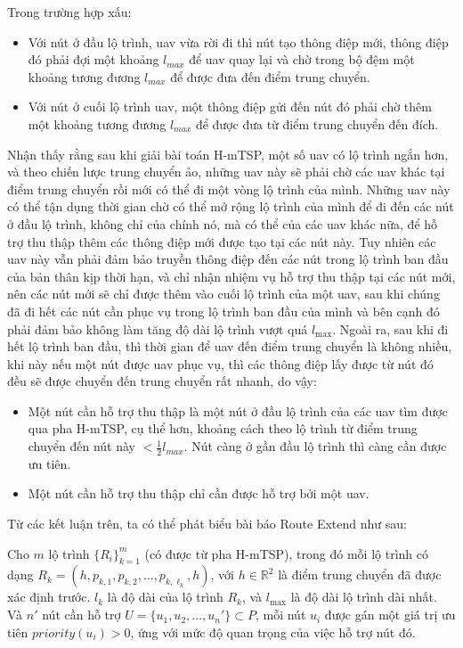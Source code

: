 \documentclass[a4paper]{article}
\begin{document}
Trong trường hợp xấu: 
\begin{itemize}
  \item Với nút ở đầu lộ trình, uav vừa rời đi thì nút tạo thông điệp mới, thông điệp đó phải đợi một khoảng $l_{max}$ để uav quay lại và chờ trong bộ đệm một khoảng tương đương $l_{max}$ để được đưa đến điểm trung chuyển.
  \item Với nút ở cuối lộ trình uav, một thông điệp gửi đến nút đó phải chờ thêm một khoảng tương đương $l_{max}$ để được đưa từ điểm trung chuyển đến đích.
\end{itemize}

Nhận thấy rằng sau khi giải bài toán H-mTSP, một số uav có lộ trình ngắn hơn, và theo chiến lược trung chuyển ảo, những uav này sẽ phải chờ các uav khác tại điểm trung chuyển rồi mới có thể đi một vòng lộ trình của mình. 
Những uav này có thể tận dụng thời gian chờ có thể mở rộng lộ trình của mình để đi đến các nút ở đầu lộ trình, không chỉ của chính nó, mà có thể của các uav khác nữa, để hỗ trợ thu thập thêm các thông điệp mới được tạo tại các nút này.
Tuy nhiên các uav này vẫn phải đảm bảo truyền thông điệp đến các nút trong lộ trình ban đầu của bản thân kịp thời hạn, và chỉ nhận nhiệm vụ hỗ trợ thu thập tại các nút mới, nên các nút mới sẽ chỉ được thêm vào cuối lộ trình của một uav, sau khi chúng đã đi hết các nút cần phục vụ trong lộ trình ban đầu của mình và bên cạnh đó phải đảm bảo không làm tăng độ dài lộ trình vượt quá $l_{\max}$.
Ngoài ra, sau khi đi hết lộ trình ban đầu, thì thời gian để uav đến điểm trung chuyển là không nhiều, khi này nếu một nút được uav phục vụ, thì các thông điệp lấy được từ nút đó đều sẽ được chuyển đến trung chuyển rất nhanh, do vậy:
\begin{itemize}
  \item Một nút cần hỗ trợ thu thập là một nút ở đầu lộ trình của các uav tìm được qua pha H-mTSP, cụ thể hơn, khoảng cách theo lộ trình từ điểm trung chuyển đến nút này $< \frac 1 2 l_{max}$. Nút càng ở gần đầu lộ trình thì càng cần được ưu tiên.
  \item Một nút cần hỗ trợ thu thập chỉ cần được hỗ trợ bởi một uav.
\end{itemize}

Từ các kết luận trên, ta có thể phát biểu bài báo Route Extend như sau:

Cho $m$ lộ trình \( \{R_i\}_{k=1}^m \) (có được từ pha H-mTSP), trong đó mỗi lộ trình có dạng
$R_k = (h, p_{k,1}, p_{k,2}, \dots, p_{k,\ell_k}, h)$,
với $h \in \mathbb{R}^2$ là điểm trung chuyển đã được xác định trước. $l_k$ là độ dài của lộ trình $R_k$, và $l_{\max}$ là độ dài lộ trình dài nhất. Và $n'$ nút cần hỗ trợ $U = \{u_1, u_2, \dots, u_n'\} \subset P$, mỗi nút $u_i$ được gán một giá trị ưu tiên $priority(u_i) > 0$, ứng với mức độ quan trọng của việc hỗ trợ nút đó.
\end{document}
